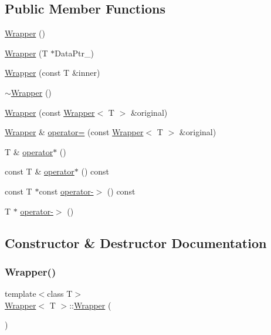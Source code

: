 \subsection*{Public Member Functions}
\begin{DoxyCompactItemize}
\item 
\hyperlink{classWrapper_a747788c9b29a997f4d805ec60e6e16a2}{Wrapper} ()
\item 
\hyperlink{classWrapper_aa9b924715f9db9487ebafbf6d8bc6e08}{Wrapper} (T $\ast$Data\+Ptr\+\_\+)
\item 
\hyperlink{classWrapper_a75fb68554d62529a071016d297018dea}{Wrapper} (const T \&inner)
\item 
\hyperlink{classWrapper_a5396fe1ce47468f5ceeec85eb423695d}{$\sim$\+Wrapper} ()
\item 
\hyperlink{classWrapper_a61fbc2f8719cbbb237bab3c94aef6a53}{Wrapper} (const \hyperlink{classWrapper}{Wrapper}$<$ T $>$ \&original)
\item 
\hyperlink{classWrapper}{Wrapper} \& \hyperlink{classWrapper_a8c19573051f3bbe811393abb3691147c}{operator=} (const \hyperlink{classWrapper}{Wrapper}$<$ T $>$ \&original)
\item 
T \& \hyperlink{classWrapper_a7ba49562f1fb7f35a27ea8197ac1713a}{operator$\ast$} ()
\item 
const T \& \hyperlink{classWrapper_a1bc06a933dbc64dbe968342d793bad26}{operator$\ast$} () const
\item 
const T $\ast$const \hyperlink{classWrapper_a099533e544d12652e9050f0db51c8bd3}{operator-\/$>$} () const
\item 
T $\ast$ \hyperlink{classWrapper_a44a92ec32cd70089debea7205b2cc0a8}{operator-\/$>$} ()
\end{DoxyCompactItemize}


\subsection{Constructor \& Destructor Documentation}
\hypertarget{classWrapper_a747788c9b29a997f4d805ec60e6e16a2}{}\label{classWrapper_a747788c9b29a997f4d805ec60e6e16a2} 
\subsubsection{\texorpdfstring{Wrapper()}{Wrapper()}\hspace{0.1cm}{\footnotesize\ttfamily [1/4]}}
{\footnotesize\ttfamily template$<$class T$>$ \\
\hyperlink{classWrapper}{Wrapper}$<$ T $>$\+::\hyperlink{classWrapper}{Wrapper} (\begin{DoxyParamCaption}{ }\end{DoxyParamCaption})\hspace{0.3cm}{\ttfamily [inline]}}

